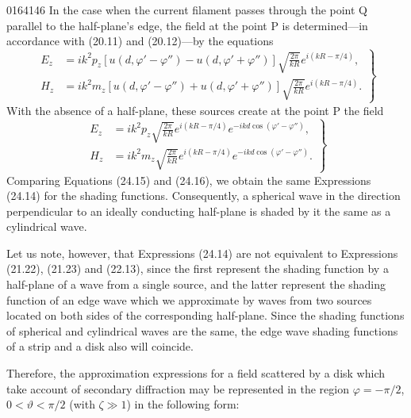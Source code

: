 \begin{scanpage}{0164}{146}
In the case when the current filament passes through the point Q parallel to the half-plane's edge, the field at the point P is determined---in accordance with (20.11) and (20.12)---by the equations
\[
\left.\begin{aligned}E_z&=ik^2p_z[u(d,\varphi'-\varphi'')-u(d,\varphi'+\varphi'')]\sqrt{\frac{2\pi}{kR}}e^{i(kR-\pi/4)},\\
H_z&=ik^2m_z[u(d,\varphi'-\varphi'')+u(d,\varphi'+\varphi'')]\sqrt{\frac{2\pi}{kR}}e^{i(kR-\pi/4)}.
\end{aligned}\right\}\tag{24.15}
\]
With the absence of a half-plane, these sources create at the point P the field
\[
\left.\begin{aligned}E_z&=ik^2p_z\sqrt{\frac{2\pi}{kR}}e^{i(kR-\pi/4)}e^{-ikd\cos(\varphi'-\varphi'')},\\
H_z&=ik^2m_z\sqrt{\frac{2\pi}{kR}}e^{i(kR-\pi/4)}e^{-ikd\cos(\varphi'-\varphi'')}.
\end{aligned}\right\}\tag{24.16}
\]
Comparing Equations (24.15) and (24.16), we obtain the same Expressions (24.14) for the shading functions. Consequently, a spherical wave in the direction perpendicular to an ideally conducting half-plane is shaded by it the same as a cylindrical wave.

Let us note, however, that Expressions (24.14) are not equivalent to Expressions (21.22), (21.23) and (22.13), since the first represent the shading function by a half-plane of a wave from a single source, and the latter represent the shading function of an edge wave which we approximate by waves from two sources located on both sides of the corresponding half-plane. Since the shading functions of spherical and cylindrical waves are the same, the edge wave shading functions of a strip and a disk also will coincide.

Therefore, the approximation expressions for a field scattered by a disk which take account of secondary diffraction may be represented in the region $\varphi=-\pi/2$, $0<\vartheta<\pi/2$ (with $\zeta\gg1$) in the following form:
\end{scanpage}

